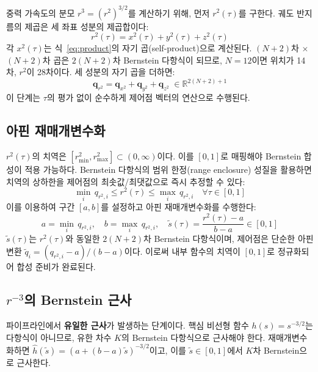 \documentclass[11pt]{article}
\begin{document}
중력 가속도의 분모 $r^3 = (r^2)^{3/2}$를 계산하기 위해,
먼저 $r^2(\tau)$를 구한다. 궤도 반지름의 제곱은 세 좌표 성분의 제곱합이다:
\begin{equation}
  r^2(\tau) = x^2(\tau) + y^2(\tau) + z^2(\tau)
  \label{eq:r2-def}
\end{equation}
각 $x^2(\tau)$는 식~\eqref{eq:product}의 자기 곱(self-product)으로 계산된다.
$(N{+}2)$차 $\times$ $(N{+}2)$차 곱은 $2(N{+}2)$차 Bernstein 다항식이 되므로,
$N=12$이면 위치가 14차, $r^2$이 28차이다.
세 성분의 자기 곱을 더하면:
\begin{equation}
  \mathbf{q}_{r^2} = \mathbf{q}_{x^2} + \mathbf{q}_{y^2} + \mathbf{q}_{z^2}
  \;\in \mathbb{R}^{2(N+2)+1}
  \label{eq:q-r2}
\end{equation}
이 단계는 $\tau$의 평가 없이 순수하게 제어점 벡터의 연산으로 수행된다.

\subsection{아핀 재매개변수화}

$r^2(\tau)$의 치역은 $[r_\mathrm{min}^2, r_\mathrm{max}^2] \subset (0, \infty)$이다.
이를 $[0,1]$로 매핑해야 Bernstein 합성이 적용 가능하다.
Bernstein 다항식의 범위 한정(range enclosure) 성질을 활용하면
치역의 상하한을 제어점의 최솟값/최댓값으로 즉시 추정할 수 있다:
\begin{equation}
  \min_i \, q_{r^2,i} \leq r^2(\tau) \leq \max_i \, q_{r^2,i}
  \quad \forall \tau \in [0,1]
  \label{eq:range-enclosure}
\end{equation}
이를 이용하여 구간 $[a, b]$를 설정하고 아핀 재매개변수화를 수행한다:
\begin{equation}
  a = \min_i \, q_{r^2,i}, \quad
  b = \max_i \, q_{r^2,i}, \quad
  \tilde{s}(\tau) = \frac{r^2(\tau) - a}{b - a} \in [0, 1]
  \label{eq:rescale}
\end{equation}
$\tilde{s}(\tau)$는 $r^2(\tau)$와 동일한 $2(N{+}2)$차 Bernstein 다항식이며,
제어점은 단순한 아핀 변환 $\tilde{q}_i = (q_{r^2,i} - a)/(b-a)$이다.
이로써 내부 함수의 치역이 $[0,1]$로 정규화되어 합성 준비가 완료된다.

\subsection{$r^{-3}$의 Bernstein 근사}
\label{ssec:rinv3}

파이프라인에서 \textbf{유일한 근사}가 발생하는 단계이다.
핵심 비선형 함수 $h(s) = s^{-3/2}$는 다항식이 아니므로,
유한 차수 $K$의 Bernstein 다항식으로 근사해야 한다.
재매개변수화하면 $\hat{h}(\tilde{s}) = (a + (b-a)\tilde{s})^{-3/2}$이고,
이를 $\tilde{s} \in [0,1]$에서 $K$차 Bernstein으로 근사한다.
\end{document}
